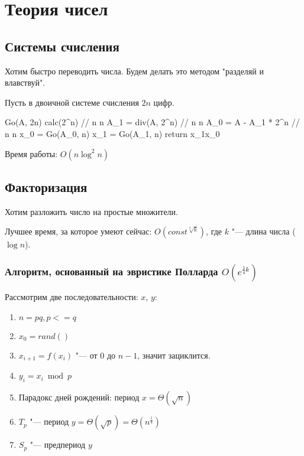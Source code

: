 \chapter{Теория чисел}

\section{Системы счисления}

Хотим быстро переводить числа. Будем делать это методом "разделяй и влавствуй".

Пусть в двоичной системе счисления $2n$ цифр.

\begin{cppcode}
Go(A, 2n) 
	calc(2^n) 			// n \log n
	A_1 = div(A, 2^n)		// n \log n
	A_0 = A - A_1 * 2^n 	// n \log n
	x_0 = Go(A_0, n)
	x_1 = Go(A_1, n)
	return x_1x_0
\end{cppcode}

Время работы: $O(n \log^2 n)$

\section{Факторизация}

Хотим разложить число на простые множители.

Лучшее время, за которое умеют сейчас: $O(const^{\sqrt[3]{k}})$, где $k$ "--- длина числа ($\log n$).

\subsection{Алгоритм, основанный на эвристике Полларда \texorpdfstring{$O(e^{\frac{1}{4}k})$}{O(e\textasciicircum(1/4) k)}}

Рассмотрим две последовательности: $x$, $y$:
\begin{enumerate}
	\item $n = pq, p <= q$
	\item $x_0 = rand()$
	\item $x_{i+1} = f(x_i)$ "--- от 0 до $n-1$, значит зациклится.
	\item $y_i = x_i \bmod p$
	\item Парадокс дней рождений: период $x = \Theta(\sqrt{n})$
	\item $T_p$ "--- период $y = \Theta(\sqrt{p}) = \Theta(n^{\frac14})$
	\item $S_p$ "--- предпериод $y$
\end{enumerate}

